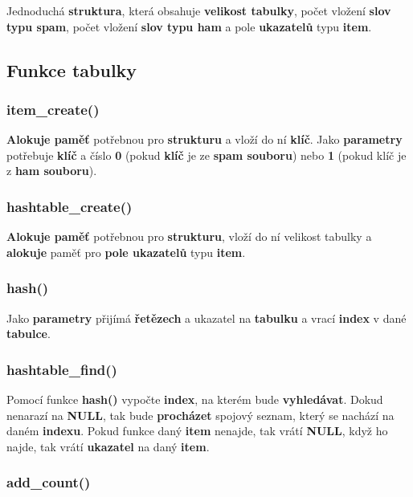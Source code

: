 \documentclass[12pt]{report}
\begin{document}
			Jednoduchá \textbf{struktura}, která obsahuje \textbf{velikost tabulky}, počet vložení \textbf{slov typu spam}, počet vložení \textbf{slov typu ham} a pole \textbf{ukazatelů} typu \textbf{item}.
			
		\subsection{Funkce tabulky}
		
			\subsubsection{item\_create()}
		
			\textbf{Alokuje paměť} potřebnou pro \textbf{strukturu} a vloží do ní \textbf{klíč}. Jako \textbf{parametry} potřebuje \textbf{klíč} a číslo \textbf{0} (pokud \textbf{klíč} je ze \textbf{spam souboru}) nebo \textbf{1} (pokud klíč je z \textbf{ham souboru}).
			
			\subsubsection{hashtable\_create()}
		
			\textbf{Alokuje paměť} potřebnou pro \textbf{strukturu}, vloží do ní velikost tabulky a \textbf{alokuje} paměť pro \textbf{pole ukazatelů} typu \textbf{item}. 
			
			\subsubsection{hash()}
			
			Jako \textbf{parametry} přijímá \textbf{řetězech} a ukazatel na \textbf{tabulku} a vrací \textbf{index} v dané \textbf{tabulce}.
			
			\subsubsection{hashtable\_find()}
			
			Pomocí funkce \textbf{hash()} vypočte \textbf{index}, na kterém bude \textbf{vyhledávat}. Dokud nenarazí na \textbf{NULL}, tak bude \textbf{procházet} spojový seznam, který se nachází na daném \textbf{indexu}. Pokud funkce daný \textbf{item} nenajde, tak vrátí \textbf{NULL}, když ho najde, tak vrátí \textbf{ukazatel} na daný \textbf{item}.
			
			\subsubsection{add\_count()}
			
\end{document}
